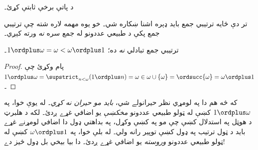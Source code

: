 \documentclass[../../../include/open-logic-section]{subfiles}
\begin{document}
\begin{prob}
د  پاتې
برخې ثابتې کړئ۔
\end{prob}

تر دې ځايه ترتيبي جمع بايد ډېره اشنا ښکاره شي۔ خو يوه مهمه
لاره شته چې ترتيبي جمع پکې د طبيعي عددونو له جمع سره \emph{نه}
ورته کېږي۔

\begin{prop}
ترتيبي جمع تبادلي \emph{نه} ده؛ $1 \ordplus  \omega = \omega <
\omega \ordplus  1$۔
\end{prop}

\begin{proof}
پام وکړئ چې $1 \ordplus  \omega = \supstrict_{n < \omega} (1 \ordplus n)
= \omega \in \omega \cup \{\omega\} = \ordsucc{\omega} = \omega
\ordplus  1$۔
\end{proof}
\noindent
که څه هم دا په لومړي نظر حيرانولے شي، \emph{بايد مو حيران نه کړي}۔
له يوې خوا، په $1 \ordplus  \omega$ کښې له ټولو طبيعي عددونو
\emph{مخکښې} يو اضافي غړے ږدئ۔ لکه د هلبرټ د هوټل په استدلال کښې
چې مو په  کښې وکړل، په بداهتي
ډول دا اضافي لومړنے غړے بايد د ټول ترتيب په ډول کښې توپير رانه ولي۔
له بلې خوا، په $\omega \ordplus  1$ کښې له ټولو طبيعي عددونو
\emph{وروسته} يو اضافي غړے ږدئ۔ دا بيا بيخي بل ډول څيز دے!
\end{document}
